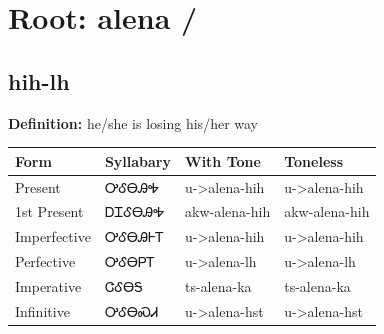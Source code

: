 \documentclass{article}%
\begin{document}
%
\normalsize%
\section*{Root: alena / }%
\subsection*{hih-lh}%
\textbf{Definition: }%
he/she is losing his/her way%
\\[0.5em]%
\begin{tabular}{|l|l|l|l|}%
\hline%
\textbf{Form}&\textbf{Syllabary}&\textbf{With Tone}&\textbf{Toneless}\\%
\hline%
Present&ᎤᎴᎾᎯᎭ&u{-}>alena{-}hih&u{-}>alena{-}hih\\%
1st Present&ᎠᏆᎴᎾᎯᎭ&akw{-}alena{-}hih&akw{-}alena{-}hih\\%
Imperfective&ᎤᎴᎾᎯᎰᎢ&u{-}>alena{-}hih&u{-}>alena{-}hih\\%
Perfective&ᎤᎴᎾᏢᎢ&u{-}>alena{-}lh&u{-}>alena{-}lh\\%
Imperative&ᏣᎴᎾᎦ&ts{-}alena{-}ka&ts{-}alena{-}ka\\%
Infinitive&ᎤᎴᎾᏍᏗ&u{-}>alena{-}hst&u{-}>alena{-}hst\\%
\hline%
\end{tabular}%
\\[1em]%
\end{document}
